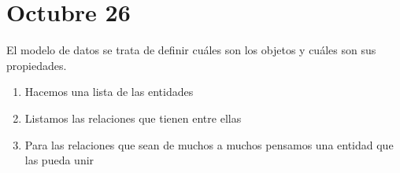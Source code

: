 \section{Octubre 26}

El modelo de datos se trata de definir cuáles son los objetos y cuáles son sus propiedades.

\begin{enumerate}
    \item Hacemos una lista de las entidades
    \item Listamos las relaciones que tienen entre ellas
    \item Para las relaciones que sean de muchos a muchos pensamos una entidad que las pueda unir
\end{enumerate}